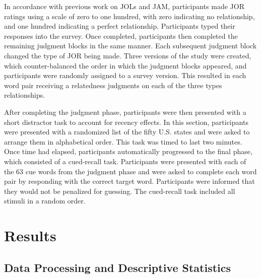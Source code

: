 \documentclass[english,man]{apa6}
\theoremstyle{definition}
\theoremstyle{definition}
\theoremstyle{definition}
\theoremstyle{remark}
\begin{document}
In accordance with previous work on JOLs and JAM, participants made JOR
ratings using a scale of zero to one hundred, with zero indicating no
relationship, and one hundred indicating a perfect relationship.
Participants typed their responses into the survey. Once completed,
participants then completed the remaining judgment blocks in the same
manner. Each subsequent judgment block changed the type of JOR being
made. Three versions of the study were created, which counter-balanced
the order in which the judgment blocks appeared, and participants were
randomly assigned to a survey version. This resulted in each word pair
receiving a relatedness judgments on each of the three types
relationships.

After completing the judgment phase, participants were then presented
with a short distractor task to account for recency effects. In this
section, participants were presented with a randomized list of the fifty
U.S. states and were asked to arrange them in alphabetical order. This
task was timed to last two minutes. Once time had elapsed, participants
automatically progressed to the final phase, which consisted of a
cued-recall task. Participants were presented with each of the 63 cue
words from the judgment phase and were asked to complete each word pair
by responding with the correct target word. Participants were informed
that they would not be penalized for guessing. The cued-recall task
included all stimuli in a random order.

\section{Results}\label{results}

\subsection{Data Processing and Descriptive
Statistics}\label{data-processing-and-descriptive-statistics}
\end{document}
